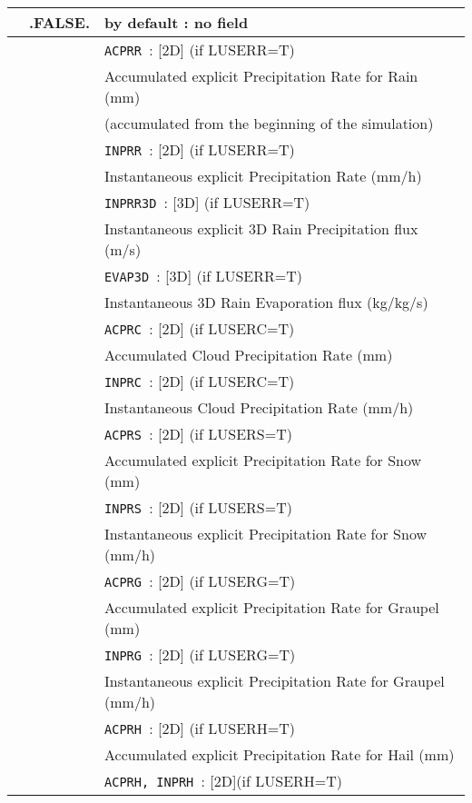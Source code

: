 \begin{center}
\begin{tabular}{|>{\centering}p{3cm}|>{\centering}p{2.5cm}|p{11cm}|}
\hline
\multirow{35}{*}{LVAR\_PR}\index{LVAR\_PR!\innam{NAM\_DIAG}}&\textbf{.FALSE.} & by default : no field \\\cline{2-3}
&\multirow{34}{*}{.TRUE.} & {\tt ACPRR }: [2D] (if LUSERR=T) \\
&&  Accumulated explicit Precipitation Rate for Rain (mm) \\\cline{3-3}
&&  (accumulated from the beginning of the simulation) \\\cline{3-3}
& &{\tt INPRR }: [2D]  (if LUSERR=T)\\
&&Instantaneous explicit Precipitation Rate (mm/h)\\\cline{3-3}
& & {\tt INPRR3D }: [3D] (if LUSERR=T)\\
&& Instantaneous explicit 3D Rain Precipitation flux (m/s) \\\cline{3-3}
& &{\tt EVAP3D }: [3D] (if LUSERR=T)\\
&& Instantaneous 3D Rain Evaporation flux (kg/kg/s) \\\cline{3-3}
& &{\tt ACPRC }: [2D] (if LUSERC=T)\\
&& Accumulated Cloud Precipitation Rate (mm)\\\cline{3-3}
& &{\tt INPRC }: [2D] (if LUSERC=T)\\
&& Instantaneous Cloud Precipitation Rate (mm/h)\\\cline{3-3}
& &{\tt ACPRS }: [2D] (if LUSERS=T)\\
&& Accumulated explicit Precipitation Rate for Snow (mm) \\\cline{3-3}
& &{\tt INPRS }: [2D] (if LUSERS=T) \\
&& Instantaneous explicit Precipitation Rate for Snow (mm/h)  \\\cline{3-3}
& &{\tt ACPRG }: [2D] (if LUSERG=T)\\
&& Accumulated explicit Precipitation Rate for Graupel (mm) \\\cline{3-3}
& &{\tt INPRG }: [2D] (if LUSERG=T)\\
&& Instantaneous explicit Precipitation Rate for Graupel (mm/h)\\\cline{3-3}
& &{\tt ACPRH }: [2D] (if LUSERH=T)\\
&& Accumulated explicit Precipitation Rate for Hail (mm)\\\cline{3-3}
& &{\tt ACPRH, INPRH }: [2D](if LUSERH=T)\\

\end{tabular}
\end{center}

